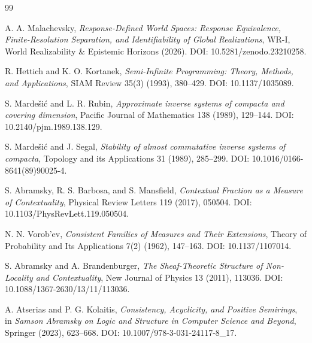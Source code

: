 \documentclass[11pt]{article}
\begin{document}
\begin{thebibliography}{99}

A. A. Malachevsky,
\emph{Response-Defined World Spaces: Response Equivalence,
Finite-Resolution Separation, and Identifiability of Global Realizations},
WR-I, World Realizability \& Epistemic Horizons (2026).
DOI: 10.5281/zenodo.23210258.



R. Hettich and K. O. Kortanek,
\emph{Semi-Infinite Programming: Theory, Methods, and Applications},
SIAM Review 35(3) (1993), 380--429.
DOI: 10.1137/1035089.

S. Marde\v{s}i\'c and L. R. Rubin,
\emph{Approximate inverse systems of compacta and covering dimension},
Pacific Journal of Mathematics 138 (1989), 129--144.
DOI: 10.2140/pjm.1989.138.129.

S. Marde\v{s}i\'c and J. Segal,
\emph{Stability of almost commutative inverse systems of compacta},
Topology and its Applications 31 (1989), 285--299.
DOI: 10.1016/0166-8641(89)90025-4.

S. Abramsky, R. S. Barbosa, and S. Mansfield,
\emph{Contextual Fraction as a Measure of Contextuality},
Physical Review Letters 119 (2017), 050504.
DOI: 10.1103/PhysRevLett.119.050504.

N. N. Vorob'ev,
\emph{Consistent Families of Measures and Their Extensions},
Theory of Probability and Its Applications 7(2) (1962), 147--163.
DOI: 10.1137/1107014.

S. Abramsky and A. Brandenburger,
\emph{The Sheaf-Theoretic Structure of Non-Locality and Contextuality},
New Journal of Physics 13 (2011), 113036.
DOI: 10.1088/1367-2630/13/11/113036.

A. Atserias and P. G. Kolaitis,
\emph{Consistency, Acyclicity, and Positive Semirings},
in \emph{Samson Abramsky on Logic and Structure in Computer Science and Beyond},
Springer (2023), 623--668.
DOI: 10.1007/978-3-031-24117-8\_17.

\end{thebibliography}
\end{document}
